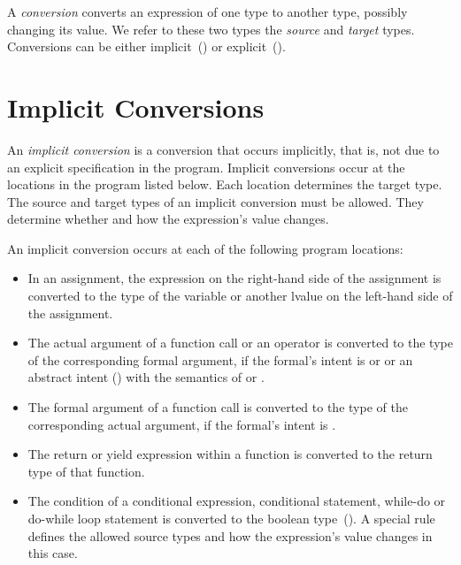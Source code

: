 \label{Conversions}

A \emph{conversion} converts an expression of one type to another type,
possibly changing its value.
We refer to these two types the \emph{source} and \emph{target} types.
Conversions can be either
implicit~() or
explicit~().


\section{Implicit Conversions}
\label{Implicit_Conversions}

An \emph{implicit conversion} is a conversion that occurs implicitly,
that is, not due to an explicit specification in the program.
Implicit conversions occur at the locations in the program listed below.
Each location determines the target type.
The source and target types of an implicit conversion must be allowed.
They determine whether and how the expression's value changes.

An implicit conversion occurs at each of the following program locations:

\begin{itemize}
\item In an assignment, the expression on the right-hand side of
      the assignment is converted to the type of the variable
      or another lvalue on the left-hand side of the assignment.

\item The actual argument of a function call or an operator is converted
      to the type of the corresponding formal argument, if the formal's
      intent is  or  or an abstract intent
      () with the semantics of
       or .

\item The formal argument of a function call is converted
      to the type of the corresponding actual argument, if the formal's
      intent is .

\item The return or yield expression within a function is converted
      to the return type of that function.

\item The condition of a conditional expression,
      conditional statement, while-do or do-while loop statement
      is converted to the boolean type~().
      A special rule defines the allowed source types and
      how the expression's value changes in this case.
\end{itemize}

